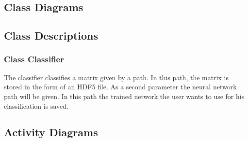 \documentclass[parskip=full]{scrartcl}
\begin{document}
\subsection{Class Diagrams}

\begin{figure}[h]
\begin{center}

\label{Class Diagram}
\end{center}
\end{figure}

\newpage


\subsection{Class Descriptions}

\subsubsection{Class Classifier}
The classifier classifies a matrix given by a path. 
In this path, the matrix is stored in the form of an HDF5 file.
As a second parameter the neural network path will be given. 
In this path the trained network the user wants to use for his classification is saved.

\newpage
 
\subsection{Activity Diagrams}
\end{document}
